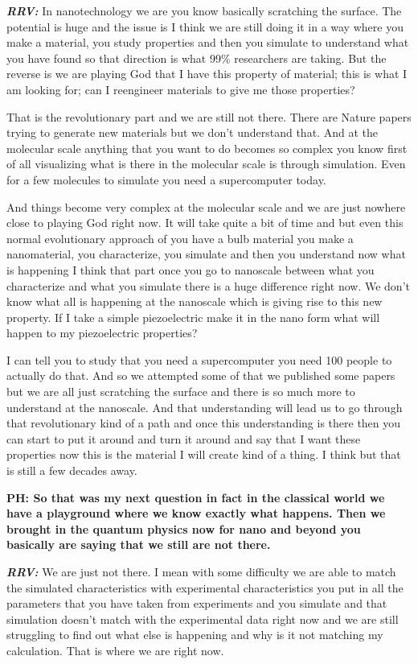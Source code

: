 \begin{multicols}{2}
\textbf{\textit{RRV:}} In nanotechnology we are you know basically scratching the surface. The potential is huge and the issue is I think we are still doing it in a way where you make a material, you study properties and then you simulate to understand what you have found so that direction is what 99\% researchers are taking. But the reverse is we are playing God that I have this property of material; this is what I am looking for; can I reengineer materials to give me those properties? 

That is the revolutionary part and we are still not there. There are Nature papers trying to generate new materials but we don’t understand that. And at the molecular scale anything that you want to do becomes so complex you know first of all visualizing what is there in the molecular scale is through simulation. Even for a few molecules to simulate you need a supercomputer today. 

And things become very complex at the molecular scale and we are just nowhere close to playing God right now. It will take quite a bit of time and but even this normal evolutionary approach of you have a bulb material you make a nanomaterial, you characterize, you simulate and then you understand now what is happening I think that part once you go to nanoscale between what you characterize and what you simulate there is a huge difference right now. We don’t know what all is happening at the nanoscale which is giving rise to this new property. If I take a simple piezoelectric make it in the nano form what will happen to my piezoelectric properties? 

I can tell you to study that you need a supercomputer you need 100 people to actually do that. And so we attempted some of that we published some papers but we are all just scratching the surface and there is so much more to understand at the nanoscale. And that understanding will lead us to go through that revolutionary kind of a path and once this understanding is there then you can start to put it around and turn it around and say that I want these properties now this is the material I will create kind of a thing. I think but that is still a few decades away.


\textbf{PH: So that was my next question in fact in the classical world we have a playground where we know exactly what happens. Then we brought in the quantum physics now for nano and beyond you basically are saying that we still are not there.}

\textbf{\textit{RRV:}} We are just not there. I mean with some difficulty we are able to match the simulated characteristics with experimental characteristics you put in all the parameters that you have taken from experiments and you simulate and that simulation doesn’t match with the experimental data right now and we are still struggling to find out what else is happening and why is it not matching my calculation. That is where we are right now. 


\end{multicols}
